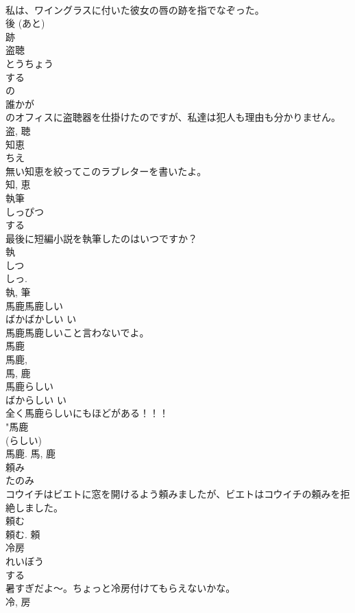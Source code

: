 \documentclass[8pt]{extreport}
\begin{document}
\begin{CJK}{UTF8}{min}
\\	私は、ワイングラスに付いた彼女の唇の跡を指でなぞった。	
\\	後 (あと) 
\\	跡	
\\	盗聴	
\\	とうちょう	
\\	する 
\\	の 
\\	誰かが
\\	のオフィスに盗聴器を仕掛けたのですが、私達は犯人も理由も分かりません。	
\\	盗, 聴	
\\	知恵	
\\	ちえ	
\\	無い知恵を絞ってこのラブレターを書いたよ。	
\\	知, 恵	
\\	執筆	
\\	しっぴつ	
\\	する 
\\	最後に短編小説を執筆したのはいつですか？	
\\	執 
\\	しつ 
\\	しっ. 
\\	執, 筆	
\\	馬鹿馬鹿しい	
\\	ばかばかしい	い 
\\	馬鹿馬鹿しいこと言わないでよ。	
\\	馬鹿 
\\	馬鹿, 
\\	馬, 鹿	
\\	馬鹿らしい	
\\	ばからしい	い 
\\	全く馬鹿らしいにもほどがある！！！	
\\	"馬鹿 
\\	(らしい) 
\\	馬鹿.	馬, 鹿	
\\	頼み	
\\	たのみ	
\\	コウイチはビエトに窓を開けるよう頼みましたが、ビエトはコウイチの頼みを拒絶しました。	
\\	頼む 
\\	頼む.	頼	
\\	冷房	
\\	れいぼう	
\\	する 
\\	暑すぎだよ〜。ちょっと冷房付けてもらえないかな。	
\\	冷, 房	

\end{CJK}
\end{document}
